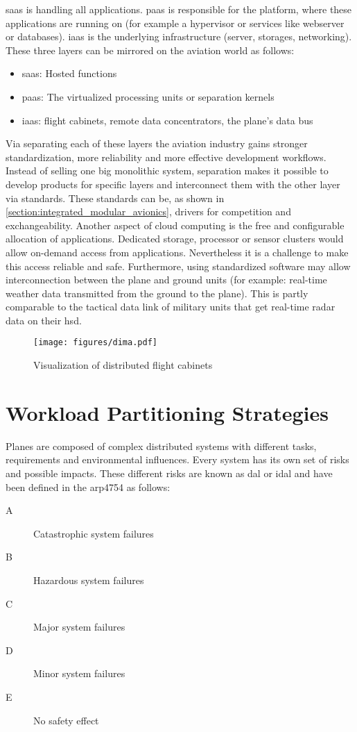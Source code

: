 \documentclass[titlepage]{report}
\begin{document}
\gls{saas} is handling all applications. \gls{paas} is responsible for the platform, where these applications
are running on (for example a hypervisor or services like webserver or databases). \gls{iaas} is the underlying
infrastructure (server, storages, networking). These three layers can be mirrored on the aviation world as follows:
\begin{itemize}
    \item \gls{saas}: Hosted functions
    \item \gls{paas}: The virtualized processing units or separation kernels
    \item \gls{iaas}: flight cabinets, remote data concentrators, the plane's data bus
\end{itemize}
Via separating each of these layers the aviation industry gains stronger standardization, more reliability and more effective
development workflows. Instead of selling one big monolithic system, separation makes it possible to develop products
for specific layers and interconnect them with the other layer via standards. These standards can be, as shown in \autoref{section:integrated_modular_avionics},
drivers for competition and exchangeability. Another aspect of cloud computing is the free and configurable allocation of applications\cite{li2012avionics}.
Dedicated storage, processor or sensor clusters would allow on-demand access from applications. Nevertheless it is a challenge to make this access reliable
and safe. Furthermore, using standardized software may allow
interconnection between the plane and ground units (for example: real-time weather data transmitted from the ground to the plane).
This is partly comparable to the tactical data link of military units that get real-time radar data on their \gls{hsd}.

\begin{figure}
    \centering
    \texttt{[image: figures/dima.pdf]}
    \caption{Visualization of distributed flight cabinets}\label{fig:dima}
\end{figure}

\section{Workload Partitioning Strategies}\label{section:workload_partitioning_strategies}
Planes are composed of complex distributed systems with different tasks, requirements and environmental influences.
Every system has its own set of risks and possible impacts.
These different risks are known as \gls{dal} or \gls{idal} and have been defined
in the \gls{arp4754} as follows\cite{arp4754a2010guidelines}:
\begin{description}
    \item[A] Catastrophic system failures
    \item[B] Hazardous system failures
    \item[C] Major system failures
    \item[D] Minor system failures
    \item[E] No safety effect    
\end{description}
\end{document}

